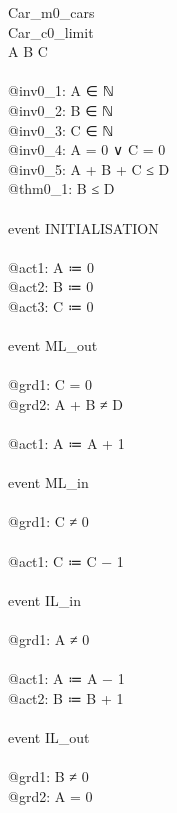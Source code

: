 \begin{description}
	\begin{center}
		\begin{Bcode}
			\Bmachine{} Car\_m0_cars\\
			\Bsees{} Car\_c0_limit\\
			\Bvariables{} A B C\\
			\Binvariants\\
			@inv0_1: A ∈ ℕ\\
			@inv0_2: B ∈ ℕ\\
			@inv0_3: C ∈ ℕ\\
			@inv0_4: A = 0 ∨ C = 0\\
			@inv0_5: A + B + C ≤ D\\
                        \Btheorem{} @thm0_1: B ≤ D\\
			\Bevents\\
			event INITIALISATION\\
			\Bthen\\
			@act1: A ≔ 0\\
			@act2: B ≔ 0\\
			@act3: C ≔ 0\\
			\Bend\\
			event ML_out\\
			\Bwhere\\
			@grd1: C = 0\\
			@grd2: A + B ≠ D\\
			\Bthen\\
			@act1: A ≔ A + 1\\
			\Bend\\
			event ML_in\\
			\Bwhere\\
			@grd1: C ≠ 0\\
			\Bthen\\
			@act1: C ≔ C − 1\\
			\Bend\\
			event IL_in\\
			\Bwhere\\
			@grd1: A ≠ 0\\
			\Bthen\\
			@act1: A ≔ A − 1\\
			@act2: B ≔ B + 1\\
			\Bend\\
			event IL_out\\
			\Bwhere\\
			@grd1: B ≠ 0\\
			@grd2: A = 0\\
			\Bthen\\

\end{Bcode}
\end{center}
\end{description}

